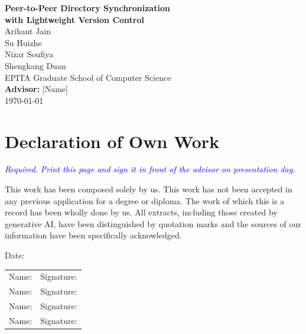\documentclass[12pt,oneside]{report}
\newcommand{\note}[1]{\textcolor{blue}{\textit{#1}}}
\begin{document}
\begin{titlepage}
    \centering
    \vspace*{3cm}
    {\LARGE \textbf{Peer-to-Peer Directory Synchronization\\with Lightweight Version Control}}\\
    \vspace{1.5cm}
    \large
    Arihant Jain \\ Su Huizhe \\ Nizar Soufiya \\ Shengkang Duan \\
    \vspace{1.5cm}
    EPITA Graduate School of Computer Science\\
    \vspace{1cm}
    \textbf{Advisor:} [Name]\\
    \vfill
    \today
\end{titlepage}

\chapter*{Declaration of Own Work}
\note{Required. Print this page and sign it in front of the advisor on presentation day.}

This work has been composed solely by us.
This work has not been accepted in any previous application for a degree or diploma.
The work of which this is a record has been wholly done by us.
All extracts, including those created by generative AI, have been distinguished by quotation marks and the sources of our information have been specifically acknowledged.

\vspace{1cm}
Date: \underline{\hspace{4cm}}

\begin{tabular}{p{6cm} p{6cm}}
Name: \underline{\hspace{4cm}} & Signature: \underline{\hspace{4cm}} \\[0.8cm]
Name: \underline{\hspace{4cm}} & Signature: \underline{\hspace{4cm}} \\[0.8cm]
Name: \underline{\hspace{4cm}} & Signature: \underline{\hspace{4cm}} \\[0.8cm]
Name: \underline{\hspace{4cm}} & Signature: \underline{\hspace{4cm}} \\
\end{tabular}
\end{document}
